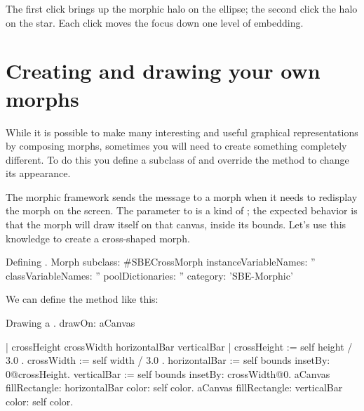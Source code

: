 \documentclass[a4paper,10pt,twoside]{book}
\begin{document}
\noindent
The first click brings up the morphic halo on the ellipse; the second click the halo on the star.
Each click moves the focus down one level of embedding.


\section{Creating and drawing your own morphs}

While it is possible to make many interesting and useful graphical representations by composing morphs, sometimes you will need to create something completely different.
To do this you define a subclass of  and override the  method to change its appearance.

The morphic framework sends the message  to a morph when it needs to redisplay the morph on the screen.
The parameter to  is a kind of ; the expected behavior is that the morph will draw itself on that canvas, inside its bounds.
Let's use this knowledge to create a cross-shaped morph.

\begin{classdef}{Defining .}
Morph subclass: #SBECrossMorph
	instanceVariableNames: ''
	classVariableNames: ''
	poolDictionaries: ''
	category: 'SBE-Morphic'
\end{classdef}

We can define the  method like this:

\begin{method}[firstDrawOn]{Drawing a .}
drawOn: aCanvas

	| crossHeight crossWidth horizontalBar verticalBar |
	crossHeight := self height / 3.0 .
	crossWidth := self width / 3.0 .
	horizontalBar := self bounds insetBy: 0@crossHeight.
	verticalBar := self bounds insetBy: crossWidth@0.
	aCanvas fillRectangle: horizontalBar color: self color.
	aCanvas fillRectangle: verticalBar color: self color.
\end{method}
\end{document}
